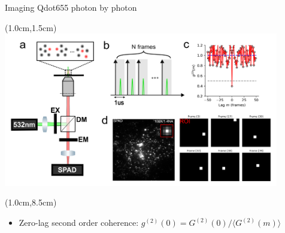 \documentclass{beamer}					%
\begin{document}


\begin{frame}{Imaging Qdot655 photon by photon}
\begin{textblock*}{12cm}(1.0cm,1.5cm)
\includegraphics[width=12cm]{../../spad/spad/media/Figure-0.png}
\end{textblock*}
\begin{textblock*}{13cm}(1.0cm,8.5cm)
\begin{itemize}
\item Zero-lag second order coherence: $g^{(2)}(0) = G^{(2)}(0)/\langle G^{(2)}(m)\rangle$
\end{itemize}
\end{textblock*}

\end{frame}
\end{document}
